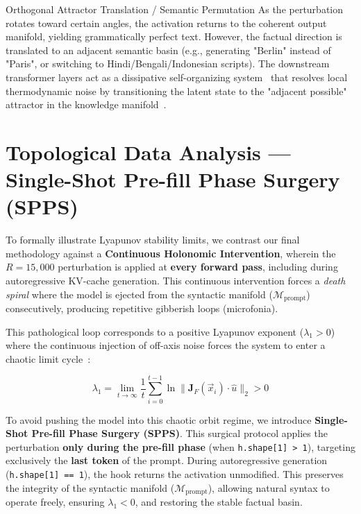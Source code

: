 \documentclass[11pt,a4paper,oneside]{scrbook}
\begin{document}
\begin{subsection}{Orthogonal Attractor Translation / Semantic Permutation}
As the perturbation rotates toward certain angles, the activation returns to the coherent output manifold, yielding grammatically perfect text. However, the factual direction is translated to an adjacent semantic basin (e.g., generating "Berlin" instead of "Paris", or switching to Hindi/Bengali/Indonesian scripts). The downstream transformer layers act as a dissipative self-organizing system~\cite{prigogine1977self} that resolves local thermodynamic noise by transitioning the latent state to the "adjacent possible" attractor in the knowledge manifold~\cite{kauffman1993origins}.
\end{subsection}

\chapter{Topological Data Analysis --- Single-Shot Pre-fill Phase Surgery (SPPS)}
\label{sec:tda_gemma3}

To formally illustrate Lyapunov stability limits, we contrast our final methodology against a \textbf{Continuous Holonomic Intervention}, wherein the $R = 15,000$ perturbation is applied at \textbf{every forward pass}, including during autoregressive KV-cache generation. This continuous intervention forces a \textit{death spiral} where the model is ejected from the syntactic manifold ($\mathcal{M}_{\text{prompt}}$) consecutively, producing repetitive gibberish loops (microfonia). 

This pathological loop corresponds to a positive Lyapunov exponent ($\lambda_1 > 0$) where the continuous injection of off-axis noise forces the system to enter a chaotic limit cycle~\cite{kiwitt2026lyapunov}:

\begin{equation}
\lambda_1 = \lim_{t \to \infty} \frac{1}{t} \sum_{i=0}^{t-1} \ln \| \mathbf{J}_F(\vec{x}_i) \cdot \hat{u} \|_2 > 0
\label{eq:lyapunov_spectra}
\end{equation}

To avoid pushing the model into this chaotic orbit regime, we introduce \textbf{Single-Shot Pre-fill Phase Surgery (SPPS)}. This surgical protocol applies the perturbation \textbf{only during the pre-fill phase} (when \texttt{h.shape[1] > 1}), targeting exclusively the \textbf{last token} of the prompt. During autoregressive generation (\texttt{h.shape[1] == 1}), the hook returns the activation unmodified. This preserves the integrity of the syntactic manifold ($\mathcal{M}_{\text{prompt}}$), allowing natural syntax to operate freely, ensuring $\lambda_1 < 0$, and restoring the stable factual basin.
\end{document}
